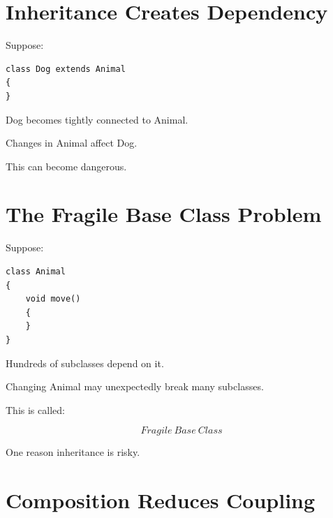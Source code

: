 \documentclass[11pt,a4paper]{book}
\begin{document}

\section{Inheritance Creates Dependency}

Suppose:

\begin{verbatim}
class Dog extends Animal
{
}
\end{verbatim}


Dog becomes tightly connected to Animal.


Changes in Animal affect Dog.


This can become dangerous.


\section{The Fragile Base Class Problem}

Suppose:

\begin{verbatim}
class Animal
{
    void move()
    {
    }
}
\end{verbatim}


Hundreds of subclasses depend on it.


Changing Animal may unexpectedly
break many subclasses.


This is called:

\[
Fragile\ Base\ Class
\]


One reason inheritance is risky.


\section{Composition Reduces Coupling}
\end{document}
